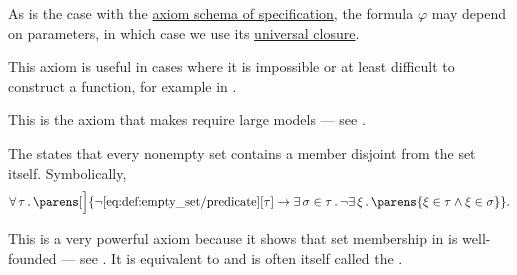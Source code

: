 \begin{definition}
\begin{thmenum}
    As is the case with the \hyperref[def:zfc/specification]{axiom schema of specification}, the formula \( \varphi \) may depend on parameters, in which case we use its \hyperref[thm:implicit_universal_quantification]{universal closure}.

    This axiom is useful in cases where it is impossible or at least difficult to construct a function, for example in .

    This is the axiom that makes  require large models --- see .

     The  states that every nonempty set contains a member disjoint from the set itself. Symbolically,
    \begin{equation}\label{eq:def:zfc/foundation}
      \qforall \tau \parens[\Big]
        {
          \neg \ref{eq:def:empty_set/predicate}[\tau]
          \rightarrow
          \qexists {\sigma \in \tau} \neg \qexists \xi \parens{ \xi \in \tau \wedge \xi \in \sigma }
        }.
    \end{equation}

    This is a very powerful axiom because it shows that set membership in  is well-founded --- see . It is equivalent to  and is often itself called the .
  \end{thmenum}
\end{definition}

